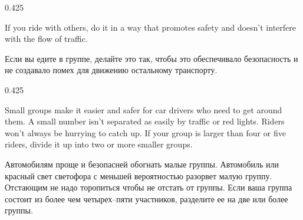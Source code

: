 

\begin{langblock}{0.425}
	\begin{eng}
	
	If you ride with others, do it in a way that promotes safety and doesn't interfere with the flow of traffic.
	\end{eng}
	\begin{rus}
		
		Если вы едите в группе, делайте это так, чтобы это обеспечивало безопасность и не создавало помех для движению остальному транспорту.
\end{rus}
\end{langblock}






\begin{langblock}{0.425}
	\begin{eng}
	
	Small groups make it easier and safer for car drivers who need to get around them. A small number isn't separated as easily by traffic or red lights. Riders won't always be hurrying to catch up. If your group is larger than four or five riders, divide it up into two or more smaller groups.
	\end{eng}
	\begin{rus}
		
		Автомобилям проще и безопасней обогнать малые группы. Автомобиль или красный свет светофора с меньшей вероятностью разорвет малую группу. Отстающим не надо торопиться чтобы не отстать от группы. Если ваша группа состоит из более чем четырех–пяти участников, разделите ее на две или более группы.
\end{rus}
\end{langblock}




